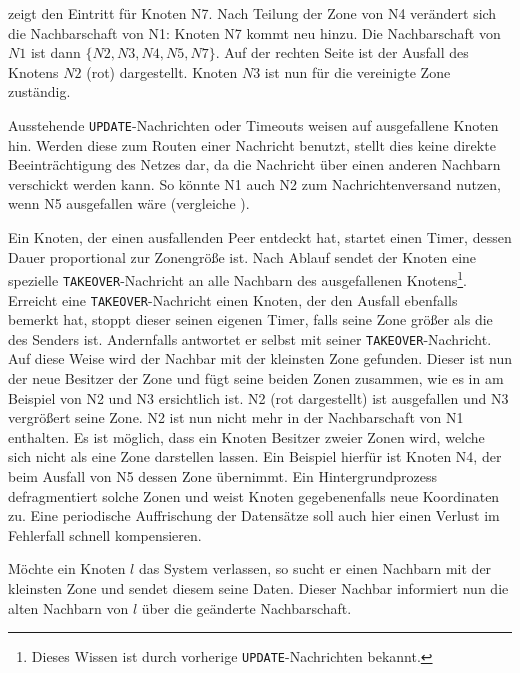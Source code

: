  zeigt den Eintritt für Knoten N7. Nach Teilung der Zone von N4 verändert sich die Nachbarschaft von N1: Knoten N7 kommt neu hinzu. Die Nachbarschaft von $N1$ ist dann $\{N2, N3, N4, N5, N7\}$. Auf der rechten Seite ist der Ausfall des Knotens $N2$ (rot) dargestellt. Knoten $N3$ ist nun für die vereinigte Zone zuständig.

Ausstehende \texttt{UPDATE}-Nachrichten oder Timeouts weisen auf ausgefallene Knoten hin. Werden diese zum Routen einer Nachricht benutzt, stellt dies keine direkte Beeinträchtigung des Netzes dar, da die Nachricht über einen anderen Nachbarn verschickt werden kann. So könnte N1 auch N2 zum Nachrichtenversand nutzen, wenn N5 ausgefallen wäre (vergleiche ).

Ein Knoten, der einen ausfallenden Peer entdeckt hat, startet einen Timer, dessen Dauer proportional zur Zonengröße ist. Nach Ablauf sendet der Knoten eine spezielle \texttt{TAKEOVER}-Nachricht an alle Nachbarn des ausgefallenen Knotens\footnote{Dieses Wissen ist durch vorherige \texttt{UPDATE}-Nachrichten bekannt.}. Erreicht eine \texttt{TAKEOVER}-Nachricht einen Knoten, der den Ausfall ebenfalls bemerkt hat, stoppt dieser seinen eigenen Timer, falls seine Zone größer als die des Senders ist. Andernfalls antwortet er selbst mit seiner \texttt{TAKEOVER}-Nachricht. Auf diese Weise wird der Nachbar mit der kleinsten Zone gefunden. Dieser ist nun der neue Besitzer der Zone und fügt seine beiden Zonen zusammen, wie es in  am Beispiel von N2 und N3 ersichtlich ist. N2 (rot dargestellt) ist ausgefallen und N3 vergrößert seine Zone. N2 ist nun nicht mehr in der Nachbarschaft von N1 enthalten. Es ist möglich, dass ein Knoten Besitzer zweier Zonen wird, welche sich nicht als eine Zone darstellen lassen. Ein Beispiel hierfür ist Knoten N4, der beim Ausfall von N5 dessen Zone übernimmt. Ein Hintergrundprozess defragmentiert solche Zonen und weist Knoten gegebenenfalls neue Koordinaten zu. Eine periodische Auffrischung der Datensätze soll auch hier einen Verlust im Fehlerfall schnell kompensieren.

Möchte ein Knoten $l$ das System verlassen, so sucht er einen Nachbarn mit der kleinsten Zone und sendet diesem seine Daten. Dieser Nachbar informiert nun die alten Nachbarn von $l$ über die geänderte Nachbarschaft.
